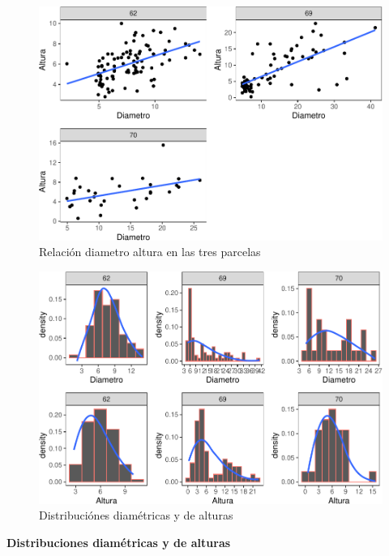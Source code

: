 \documentclass[conference,final,12pt,]{IEEEtran}
\makeatletter
\def\maxwidth{\ifdim\Gin@nat@width>\linewidth\linewidth
\else\Gin@nat@width\fi}
\let\Oldincludegraphics\includegraphics
\renewcommand{\includegraphics}[1]{\Oldincludegraphics[width=\maxwidth]{#1}}
\makeatother
\begin{document}
\begin{figure}[htb]
\centering
\includegraphics{mangrove_files/figure-latex/unnamed-chunk-14-1.pdf}
\caption{Relación diametro altura en las tres parcelas}
\end{figure}

\begin{figure}[htb]
\centering
\includegraphics{mangrove_files/figure-latex/unnamed-chunk-15-1.pdf}
\caption{Distribuciónes diamétricas y de alturas}
\end{figure}

\textbf{Distribuciones diamétricas y de alturas}
\end{document}
